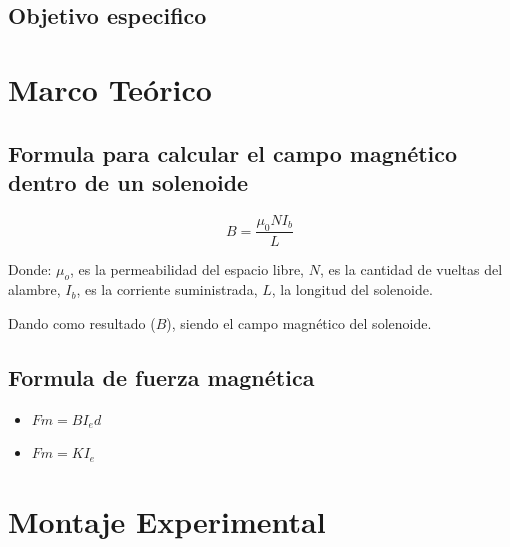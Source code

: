 \documentclass[twocolumn, 12pt]{article}
\begin{document}
\subsection{Objetivo especifico}


\section{Marco Teórico}

\subsection*{Formula para calcular el campo magnético dentro de un solenoide}

\begin{equation}
	B = {\frac{\mu_0 N I_b}{L}} \label{eq:FormulaCampoMagneticoSolenoide}
\end{equation}

\nocite{Garcia2016}

Donde: \hfill \break{} \textit{{\large $\mu_o$}}, es la permeabilidad del
espacio libre, \textit{{\large $N$}}, es la cantidad de vueltas del alambre,
\textit{{\large $I_b$}}, es la corriente suministrada, \textit{{\large $L$}},
la longitud del solenoide.

Dando como resultado (\textit{{\large $B$}}), siendo el campo magnético
del solenoide.

\subsection*{Formula de fuerza magnética}

\begin{itemize}[label=$\triangleright$]
	\item {\large $Fm = B I_e d$}
	\item {\large $Fm = K I_e$}
\end{itemize}

\section{Montaje Experimental}

\end{document}

